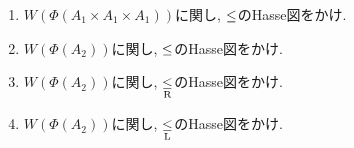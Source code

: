 \begin{enumerate}
  \item $W(\Phi(A_1\times A_1\times A_1))$に関し, $\mathrel{\leq}$のHasse図をかけ.
  \item $W(\Phi(A_2))$に関し, $\mathrel{\leq}$のHasse図をかけ.
  \item $W(\Phi(A_2))$に関し, $\mathrel{\underset{\text{R}}{\leq}}$のHasse図をかけ.
  \item $W(\Phi(A_2))$に関し, $\mathrel{\underset{\text{L}}{\leq}}$のHasse図をかけ.
\end{enumerate}

